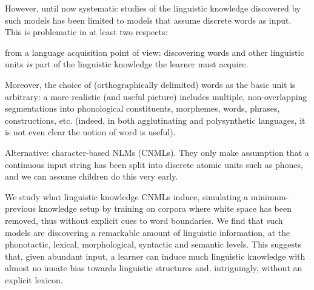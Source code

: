 However, until now
systematic studies of the linguistic knowledge discovered by such
models has been limited to models that assume discrete words as
input. This is problematic in at least two
respects: \begin{inparaenum}[i)]
\item from a language
  acquisition point of view: discovering words and other linguistic
  units \emph{is} part of the linguistic knowledge the learner must
  acquire. 
\item Moreover, the choice of (orthographically delimited) words as
  the basic unit is arbitrary: a more realistic (and useful picture)
  includes multiple, non-overlapping segmentations into phonological
  constituents, morphemes, words, phrases, constructions,
  etc. (indeed, in both agglutinating and polysynthetic languages, it
  is not even clear the notion of word is useful).
\end{inparaenum}

Alternative: character-based NLMs (CNMLs). They only make assumption
that a continuous input string has been split into discrete atomic
units such as phones, and we can assume children do this very early.

We study what linguistic knowledge CNMLs induce, simulating a
minimum-previous knowledge setup by training on corpora where white
space has been removed, thus without explicit cues to word
boundaries. We find that such models are discovering a remarkable
amount of linguistic information, at the phonotactic, lexical,
morphological, syntactic and semantic levels. This suggests that,
given abundant input, a learner can induce much linguistic knowledge
with almost no innate bias towards linguistic structures and,
intriguingly, without an explicit lexicon.

\cite{Kuhl:2004}
\cite{Maye:etal:2002}

